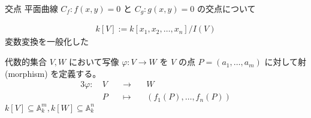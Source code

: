 \documentclass[uplatex,dvipdfmx,a4paper,11pt]{jlreq}
\renewcommand{\AA}{\mathbb{A}}
\numberwithin{equation}{section}
\theoremstyle{definition}
\begin{document}
\begin{itembox}[l]{交点}
  平面曲線 $C_f: f(x, y) = 0$ と $C_g: g(x, y) = 0$ の交点について
\end{itembox}

\begin{definition}[座標環]
  \begin{align}
    k[V] := k[x_1,x_2,\ldots,x_n]/I(V)
  \end{align}
  変数変換を一般化した

  代数的集合 $V, W$ において写像 $\varphi: V\to W$ を $V$ の点 $P = (a_1,\ldots,a_m)$ に対して射 (morphism) を定義する。
  \begin{alignat}{3}
    \varphi:\  & V \quad & \to\quad     & W                      \\
               & P \quad & \mapsto\quad & (f_1(P),\ldots,f_n(P))
  \end{alignat}
  $k[V] \subseteq \AA_k^m, k[W] \subseteq \AA_k^n$
\end{definition}
\end{document}
